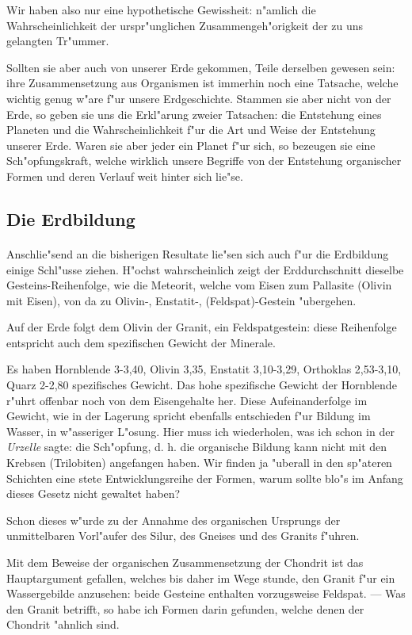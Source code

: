 \documentclass[a4paper, 11pt, oneside]{article}
\begin{document}
Wir haben also nur eine hypothetische Gewissheit: n"amlich die Wahrscheinlichkeit der urspr"unglichen Zusammengeh"origkeit der zu uns gelangten Tr"ummer.

Sollten sie aber auch von unserer Erde gekommen, Teile derselben gewesen sein: ihre Zusammensetzung aus Organismen ist immerhin noch eine Tatsache, welche wichtig genug w"are f"ur unsere Erdgeschichte. Stammen sie aber nicht von der Erde, so geben sie uns die Erkl"arung zweier Tatsachen: die Entstehung eines Planeten und die Wahrscheinlichkeit f"ur die Art und Weise der Entstehung unserer Erde. Waren sie aber jeder ein Planet f"ur sich, so bezeugen sie eine Sch"opfungskraft, welche wirklich unsere Begriffe von der Entstehung organischer Formen und deren Verlauf weit hinter sich lie"se.
\clearpage
\subsection{Die Erdbildung}
\paragraph{}
Anschlie"send an die bisherigen Resultate lie"sen sich auch f"ur die Erdbildung einige Schl"usse ziehen. H"ochst wahrscheinlich zeigt der Erddurchschnitt dieselbe Gesteins-Reihenfolge, wie die Meteorit, welche vom Eisen zum Pallasite (Olivin mit Eisen), von da zu Olivin-, Enstatit-, (Feldspat)-Gestein "ubergehen.

Auf der Erde folgt dem Olivin der Granit, ein Feldspatgestein: diese Reihenfolge entspricht auch dem spezifischen Gewicht der Minerale.

Es haben Hornblende 3-3,40, Olivin 3,35, Enstatit 3,10-3,29, Orthoklas 2,53-3,10, Quarz 2-2,80 spezifisches Gewicht. Das hohe spezifische Gewicht der Hornblende r"uhrt offenbar noch von dem Eisengehalte her. Diese Aufeinanderfolge im Gewicht, wie in der Lagerung spricht ebenfalls entschieden f"ur Bildung im Wasser, in w"asseriger L"osung. Hier muss ich wiederholen, was ich schon in der \emph{Urzelle} sagte: die Sch"opfung, d. h. die organische Bildung kann nicht mit den Krebsen (Trilobiten) angefangen haben. Wir finden ja "uberall in den sp"ateren Schichten eine stete Entwicklungsreihe der Formen, warum sollte blo"s im Anfang dieses Gesetz nicht gewaltet haben?

Schon dieses w"urde zu der Annahme des organischen Ursprungs der unmittelbaren Vorl"aufer des Silur, des Gneises und des Granits f"uhren.

Mit dem Beweise der organischen Zusammensetzung der Chondrit ist das Hauptargument gefallen, welches bis daher im Wege stunde, den Granit f"ur ein Wassergebilde anzusehen: beide Gesteine enthalten vorzugsweise Feldspat. --- Was den Granit betrifft, so habe ich Formen darin gefunden, welche denen der Chondrit "ahnlich sind.
\end{document}
